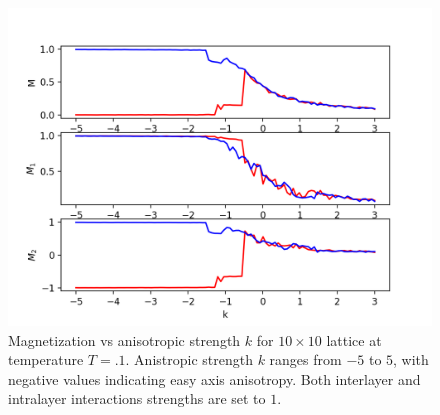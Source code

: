 \documentclass{article}
\begin{document}
\begin{figure}

  \includegraphics[width=\textwidth]{figures/magvk_1010_b.75_2.png}

\caption{Magnetization vs anisotropic strength $k$ for $10 \times 10$ lattice at temperature $T = .1$. Anistropic
strength $k$ ranges from $-5$ to $5$, with negative values indicating easy axis anisotropy. Both interlayer and intralayer interactions strengths are set to $1$.}
\end{figure}
\end{document}
